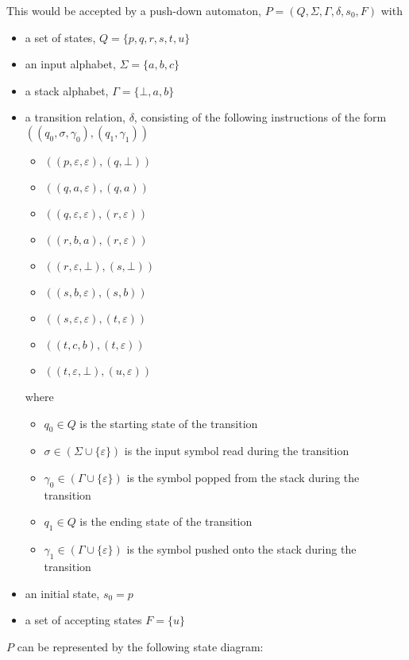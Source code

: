 \documentclass[10pt]{article} %
\begin{document}
\noindent This would be accepted by a push-down automaton, $P=(Q,\Sigma,\Gamma,\delta,s_0,F)$ with
\begin{itemize}
	\item a set of states, $Q=\{p,q,r,s,t,u\}$
	\item an input alphabet, $\Sigma=\{a,b,c\}$
	\item a stack alphabet, $\Gamma=\{\bot,a,b\}$
	\item a transition relation, $\delta$, consisting of the following instructions of the form ${((q_0,\sigma,\gamma_0),(q_1,\gamma_1))}$
	\begin{itemize}
		\item $((p,\varepsilon,\varepsilon),(q,\bot))$
		\item $((q,a,\varepsilon),(q,a))$
		\item $((q,\varepsilon,\varepsilon),(r,\varepsilon))$
		\item $((r,b,a),(r,\varepsilon))$
		\item $((r,\varepsilon,\bot),(s,\bot))$
		\item $((s,b,\varepsilon),(s,b))$
		\item $((s,\varepsilon,\varepsilon),(t,\varepsilon))$
		\item $((t,c,b),(t,\varepsilon))$
		\item $((t,\varepsilon,\bot),(u,\varepsilon))$
	\end{itemize} where
	\begin{itemize}
		\item $q_0 \in Q$ is the starting state of the transition
		\item $\sigma \in (\Sigma \cup \{\varepsilon\})$ is the input symbol read during the transition
		\item $\gamma_0 \in (\Gamma \cup \{\varepsilon\})$ is the symbol popped from the stack during the transition
		\item $q_1 \in Q$ is the ending state of the transition
		\item $\gamma_1 \in (\Gamma \cup \{\varepsilon\})$ is the symbol pushed onto the stack during the transition
	\end{itemize}
	\item an initial state, $s_0=p$
	\item a set of accepting states $F=\{u\}$
\end{itemize}

\vspace{20px}

\noindent $P$ can be represented by the following state diagram:
\end{document}
